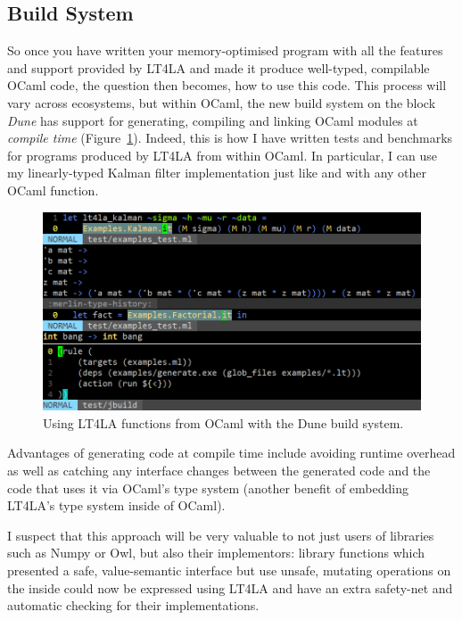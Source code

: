 \subsection{Build System}

So once you have written your memory-optimised program with all the features
and support provided by LT4LA and made it produce well-typed, compilable OCaml
code, the question then becomes, how to use this code. This process will vary
across ecosystems, but within OCaml, the new build system on the block
\emph{Dune} has support for generating, compiling and linking OCaml modules at
\emph{compile time} (Figure~\ref{fig:build}). Indeed, this is how I have written
tests and benchmarks for programs produced by LT4LA from within OCaml. In
particular, I can use my linearly-typed Kalman filter implementation just like
and with any other OCaml function.

\begin{figure}[t]
    \centering
    \includegraphics[width=\textwidth]{impl_build}
    \caption{Using LT4LA functions from OCaml with the Dune
        build system.}\label{fig:build}
\end{figure}

Advantages of generating code at compile time include avoiding runtime overhead
as well as catching any interface changes between the generated code and the
code that uses it via OCaml's type system (another benefit of embedding LT4LA's
type system inside of OCaml).

I suspect that this approach will be very valuable to not just users of
libraries such as Numpy or Owl, but also their implementors: library functions
which presented a safe, value-semantic interface but use unsafe, mutating
operations on the inside could now be expressed using LT4LA and have an extra
safety-net and automatic checking for their implementations.

